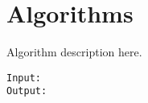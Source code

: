 
\section{Algorithms}\label{algorithms}
 Algorithm description here.

\lstset{language=java}
\begin{lstlisting}[frame=htrbl, caption={GeneratorGrammarDiceRollTopDownMartens}, label={lst:GeneratorGrammarDiceRollTopDownMartens}]
Input: 
Output: 


\end{lstlisting}

\pagebreak